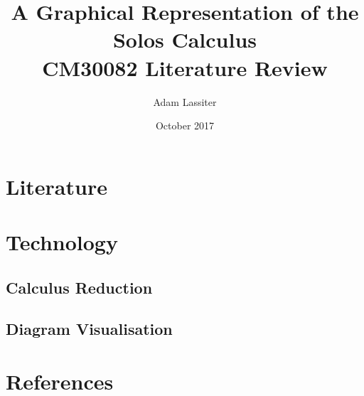 \documentclass{article}
\title{A Graphical Representation of the Solos Calculus \\
	\large CM30082 Literature Review}
\author{Adam Lassiter}
\date{October 2017}
\begin{document}
\maketitle

\vfill

\tableofcontents

\pagebreak



\section{Literature}

    


    


    


    


    



\section{Technology}

    \subsection{Calculus Reduction}


    \subsection{Diagram Visualisation}
        \cite{learning-styles}



\section{References}

    



\end{document}
